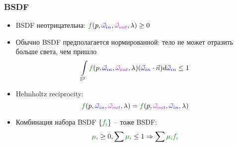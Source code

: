 \documentclass{beamer}
\begin{document}
\begin{frame}[fragile]
\frametitle{BSDF}
\begin{itemize}
\item BSDF неотрицательна: \begin{math}{\color{green}f}(p, {\color{blue}\vec\omega_{in}}, {\color{magenta}\vec\omega_{out}}, \lambda)\geq 0\end{math}
\pause
\item Обычно BSDF предполагается нормированной: тело не может отразить больше света, чем пришло
\begin{equation*}
\int\limits_{\mathbb S^2} {\color{green}f}(p, {\color{blue}\vec\omega_{in}}, {\color{magenta}\vec\omega_{out}}, \lambda)({\color{blue}\vec\omega_{in}} \cdot \vec{n}) d{\color{blue}\vec\omega_{in}} \leq 1
\end{equation*}
\pause
\item Helmholtz reciprocity:
\begin{equation*}
{\color{green}f}(p, {\color{blue}\vec\omega_{in}}, {\color{magenta}\vec\omega_{out}}, \lambda) = {\color{green}f}(p, {\color{magenta}\vec\omega_{out}}, {\color{blue}\vec\omega_{in}}, \lambda)
\end{equation*}
\pause
\item Комбинация набора BSDF \begin{math}\{{\color{green}f_i}\}\end{math} -- тоже BSDF:
\begin{equation*}
{\color{green}\mu_i} \geq 0, \sum {\color{green}\mu_i} \leq 1 \Rightarrow \sum {\color{green}\mu_i f_i}
\end{equation*}
\end{itemize}
\end{frame}
\end{document}

